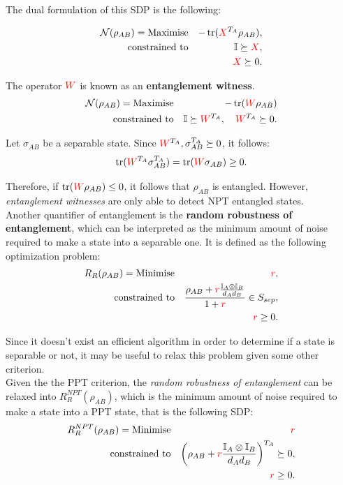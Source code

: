\documentclass[12pt, letterpaper]{article}
\begin{document}
The dual formulation of this SDP is the following:

\begin{eqnarray*}
    \mathcal{N}(\rho_{AB}) = \text{Maximise} && -\operatorname{tr}(\textcolor{red}{X}^{T_A}\rho_{AB}), \\
    \text{constrained to} && \mathbb{I} \succeq \textcolor{red}{X}, \\
    && \textcolor{red}{X} \succeq 0.
\end{eqnarray*}

The operator $\textcolor{red}{W}$ is known as an \textbf{entanglement witness}.
\begin{eqnarray*}
    \mathcal{N}(\rho_{AB}) = \text{Maximise} && -\operatorname{tr}(\textcolor{red}{W}\rho_{AB}) \\
        \text{constrained to} && \mathbb{I} \succeq \textcolor{red}{W}^{T_A}, \quad \textcolor{red}{W}^{T_A} \succeq 0.
\end{eqnarray*}

Let $\sigma_{AB}$ be a separable state. Since $\textcolor{red}{W}^{T_A}, \sigma_{AB}^{T_A} \succeq 0$, it follows:
\[
\operatorname{tr}(\textcolor{red}{W}^{T_A} \sigma_{AB}^{T_A}) = \operatorname{tr}(\textcolor{red}{W}\sigma_{AB}) \geq 0.
\] 

Therefore, if $\operatorname{tr}(\textcolor{red}{W}\rho_{AB}) \leq 0$, it follows that $\rho_{AB}$ is entangled. However, \textit{entanglement witnesses} are only able to detect NPT entangled states.\\

Another quantifier of entanglement is the \textbf{random robustness of entanglement}, which can be interpreted as the minimum amount of noise required to make a state into a separable one. It is defined as the following optimization problem:
\begin{eqnarray*}
        R_R(\rho_{AB}) = \text{Minimise} && \textcolor{red}{r}, \\
        \text{constrained to} && \frac{\rho_{AB} + \textcolor{red}{r}\frac{\mathbb{I}_A \otimes \mathbb{I}_B}{d_A d_B}}{1 + \textcolor{red}{r}} \in S_{sep}, \\
        && \textcolor{red}{r} \geq 0.
\end{eqnarray*}

Since it doesn't exist an efficient algorithm in order to determine if a state is separable or not, it may be useful to relax this problem given some other criterion.\\

Given the the PPT criterion, the \textit{random robustness of entanglement} can be relaxed into $R_R^{NPT}(\rho_{AB})$, which is the minimum amount of noise required to make a state into a PPT state, that is the following SDP:
\begin{eqnarray*}
    R_R^{NPT}(\rho_{AB}) = \text{Minimise} && \textcolor{red}{r} \\
    \text{constrained to} && \left( \rho_{AB} + \textcolor{red}{r}\frac{\mathbb{I}_A \otimes \mathbb{I}_B}{d_A d_B} \right)^{T_A} \succeq 0,\\
    && \textcolor{red}{r} \geq 0.
\end{eqnarray*}
\end{document}
